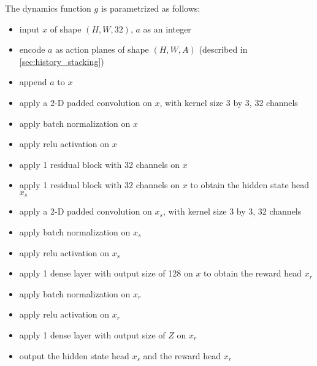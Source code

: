 The dynamics function $g$ is parametrized as follows:
\begin{itemize}
    \item input $x$ of shape $(H, W, 32)$, $a$ as an integer
    \item encode $a$ as action planes of shape $(H, W, A)$ (described in \ref{sec:history_stacking})
    \item append $a$ to $x$

    \item apply a 2-D padded convolution on $x$, with kernel size 3 by 3, 32 channels
    \item apply batch normalization on $x$
    \item apply relu activation on $x$

    \item apply 1 residual block with 32 channels on $x$

    \item apply 1 residual block with 32 channels on $x$ to obtain the hidden state head $x_s$
    \item apply a 2-D padded convolution on $x_s$, with kernel size 3 by 3, 32 channels
    \item apply batch normalization on $x_s$
    \item apply relu activation on $x_s$

    \item apply 1 dense layer with output size of 128 on $x$ to obtain the reward head $x_r$
    \item apply batch normalization on $x_r$
    \item apply relu activation on $x_r$
    \item apply 1 dense layer with output size of $Z$ on $x_r$

    \item output the hidden state head $x_s$ and the reward head $x_r$
\end{itemize}

